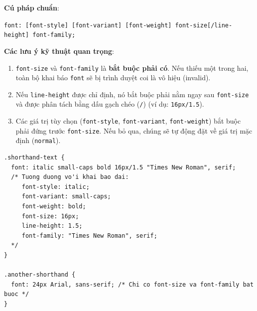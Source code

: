 \documentclass[11pt,oneside]{book}
\newcommand{\codeinline}[1]{\textcolor{accentOrange}{\texttt{#1}}}
\begin{document}
\begin{warnBox}
\textbf{Cú pháp chuẩn}:
\begin{center}
\codeinline{font: [font-style] [font-variant] [font-weight] font-size[/line-height] font-family;}
\end{center}
\textbf{Các lưu ý kỹ thuật quan trọng}:
\begin{enumerate}[leftmargin=1.5em, itemsep=3pt, parsep=0pt]
    \item \codeinline{font-size} và \codeinline{font-family} là \textbf{bắt buộc phải có}. Nếu thiếu một trong hai, toàn bộ khai báo \codeinline{font} sẽ bị trình duyệt coi là vô hiệu (invalid).
    \item Nếu \codeinline{line-height} được chỉ định, nó bắt buộc phải nằm ngay sau \codeinline{font-size} và được phân tách bằng dấu gạch chéo (\codeinline{/}) (ví dụ: \codeinline{16px/1.5}).
    \item Các giá trị tùy chọn (\codeinline{font-style}, \codeinline{font-variant}, \codeinline{font-weight}) bắt buộc phải đứng trước \codeinline{font-size}. Nếu bỏ qua, chúng sẽ tự động đặt về giá trị mặc định (\codeinline{normal}).
\end{enumerate}
\end{warnBox}

\begin{codeWindow}
\begin{lstlisting}[language=CSS3]
.shorthand-text {
  font: italic small-caps bold 16px/1.5 "Times New Roman", serif;
  /* Tuong duong vo'i khai bao dai:
     font-style: italic;
     font-variant: small-caps;
     font-weight: bold;
     font-size: 16px;
     line-height: 1.5;
     font-family: "Times New Roman", serif;
  */
}

.another-shorthand {
  font: 24px Arial, sans-serif; /* Chi co font-size va font-family bat buoc */
}
\end{lstlisting}
\end{codeWindow}
\end{document}
